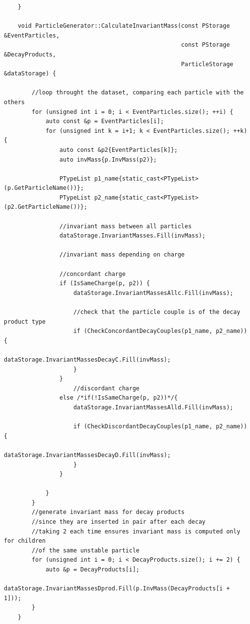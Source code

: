 \documentclass[12pt, a4paper]{article}
\begin{document}
\begin{verbatim}
    }

    void ParticleGenerator::CalculateInvariantMass(const PStorage &EventParticles,
                                                   const PStorage &DecayProducts,
                                                   ParticleStorage &dataStorage) {

        //loop throught the dataset, comparing each particle with the others
        for (unsigned int i = 0; i < EventParticles.size(); ++i) {
            auto const &p = EventParticles[i];
            for (unsigned int k = i+1; k < EventParticles.size(); ++k) {
                auto const &p2{EventParticles[k]};
                auto invMass{p.InvMass(p2)};

                PTypeList p1_name{static_cast<PTypeList>(p.GetParticleName())};
                PTypeList p2_name{static_cast<PTypeList>(p2.GetParticleName())};

                //invariant mass between all particles
                dataStorage.InvariantMasses.Fill(invMass);

                //invariant mass depending on charge

                //concordant charge
                if (IsSameCharge(p, p2)) {
                    dataStorage.InvariantMassesAllc.Fill(invMass);

                    //check that the particle couple is of the decay product type
                    if (CheckConcordantDecayCouples(p1_name, p2_name)) {
                        dataStorage.InvariantMassesDecayC.Fill(invMass);
                    }
                }
                    //discordant charge
                else /*if(!IsSameCharge(p, p2))*/{
                    dataStorage.InvariantMassesAlld.Fill(invMass);

                    if (CheckDiscordantDecayCouples(p1_name, p2_name)) {
                        dataStorage.InvariantMassesDecayD.Fill(invMass);
                    }
                }

            }
        }
        //generate invariant mass for decay products
        //since they are inserted in pair after each decay
        //taking 2 each time ensures invariant mass is computed only for children
        //of the same unstable particle
        for (unsigned int i = 0; i < DecayProducts.size(); i += 2) {
            auto &p = DecayProducts[i];
            dataStorage.InvariantMassesDprod.Fill(p.InvMass(DecayProducts[i + 1]));
        }
    }


\end{verbatim}
\end{document}
